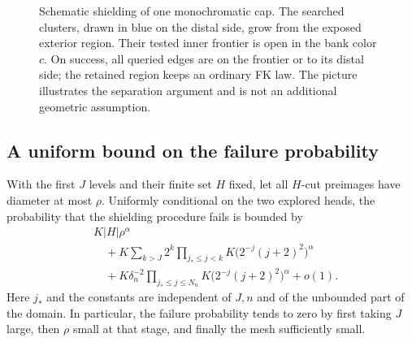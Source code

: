 \begin{figure}[!htb]
\centering
{}
\caption{Schematic shielding of one monochromatic cap.
The searched clusters, drawn in blue on the distal side, grow
from the exposed exterior region.
Their tested inner frontier is open in the bank color \(c\).
On success, all queried edges are on the frontier or to its
distal side; the retained region keeps an ordinary FK law.
The picture illustrates the separation argument and is not
an additional geometric assumption.}
\label{loc:fig-shield}
\end{figure}
\FloatBarrier

\subsection{A uniform bound on the failure probability}
\begin{lemma}
\label{loc:failure}
With the first \(J\) levels and their finite set \(H\) fixed,
let all \(H\)-cut preimages have diameter at most \(\rho\).
Uniformly conditional on the two explored heads, the probability
that the shielding procedure fails is bounded by
\begin{equation}
 \begin{aligned}
 &K|H|\rho^\alpha\\
 &\quad+K\sum_{k>J}2^k
     \prod_{j_*\le j<k}K\bigl(2^{-j}(j+2)^2\bigr)^\alpha\\
 &\quad+K\delta_n^{-2}
     \prod_{j_*\le j\le N_n}K\bigl(2^{-j}(j+2)^2\bigr)^\alpha
 +o(1).
 \end{aligned}
 \label{loc:failure-bound}
\end{equation}
Here \(j_*\) and the constants are independent of \(J,n\)
and of the unbounded part of the domain. In particular,
the failure probability tends to zero by first taking
\(J\) large, then \(\rho\) small at that stage, and finally
the mesh sufficiently small.
\end{lemma}

